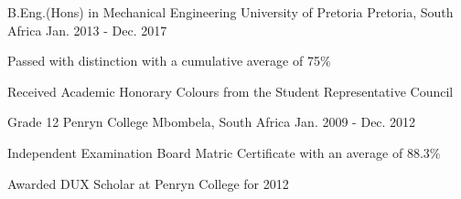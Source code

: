 

\begin{cventries}

  \cventry
    {B.Eng.(Hons) in Mechanical Engineering} %
    {University of Pretoria} %
    {Pretoria, South Africa} %
    {Jan. 2013 - Dec. 2017} %
    {
      \begin{cvitems} %
        \item {Passed with distinction with a cumulative average of 75\%}
        \item {Received Academic Honorary Colours from the Student Representative Council}
      \end{cvitems}
    }
  \cventry
    {Grade 12} %
    {Penryn College} %
    {Mbombela, South Africa} %
    {Jan. 2009 - Dec. 2012} %
    {
      \begin{cvitems} %
        \item {Independent Examination Board Matric Certificate with an average of 88.3\%}
        \item {Awarded DUX Scholar at Penryn College for 2012}
      \end{cvitems}
    }


\end{cventries}
